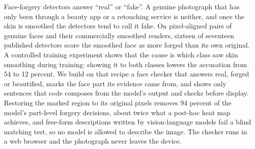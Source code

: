 Face-forgery detectors answer ``real'' or ``fake''. A genuine photograph that has only been through a beauty app or a
retouching service is neither, and once the skin is smoothed the detectors tend to call it fake. On pixel-aligned pairs of
genuine faces and their commercially smoothed renders, sixteen of seventeen published detectors score the smoothed face as more
forged than its own original. A controlled training experiment shows that the cause is which class saw skin smoothing during
training: showing it to both classes lowers the accusation from 54 to 12 percent. We build on that recipe a face checker that
answers real, forged or beautified, marks the face part its evidence came from, and shows only sentences that code composes from
the model's output and checks before display. Restoring the marked region to its original pixels removes 94 percent of the
model's part-level forgery decisions, about twice what a post-hoc heat map achieves, and free-form descriptions written by
vision-language models fail a blind matching test, so no model is allowed to describe the image. The checker runs in a web
browser and the photograph never leaves the device.

